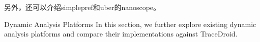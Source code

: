 另外，还可以介绍simplepref和uber的nanoscope。

Dynamic Analysis Platforms In this section, we further explore existing dynamic analysis platforms and compare their implementations against TraceDroid. 


\begin{comment}

6.3.1 AASandbox 
In October 2010, Blasing et al. were the first to present a dynamic analysis platform for Android applications: AASandbox (Android Application Sandbox) [7]. It uses static analysis to scan software for malicious patterns and performs dynamic analysis to intervene and log low-level interactions with the system for further analysis by means of a loadable kernel module developed to obtain system call logs. AASandbox uses a system call footprinting approach for detecting suspicious applications. Unfortunately, there were no known Android malware samples available at the time to evaluate this technique. AASandbox seems to be unmaintained nowadays. Compared to AASandbox, TraceDroid is implemented on a higher abstraction layer, namely the Dalvik VM instead of the Linux kernel. This allows TraceDroid to retrieve great detail on executed Java components, while missing any native code execution paths. By using the strace utility, however, we obtain a similar overview of executed system calls. We already use analysis output to detect suspicious activity. 
6.3.2 TaintDroid 
Also in October 2010, Enck et al. presented TaintDroid: a modified Android OS keeping track of taint propagation at runtime to detect privacy leaks [26]. Over time, it has been adopted as a valuable addition by many subsequent research proposals which aim to perform dynamic analysis on Android applications. TaintDroid is implemented as a modification of the Dalvik VM and thus cannot track taint within native code. TaintDroid does not come with a set of scripts or applications to allow automated analysis and stimulation of unknown applications and is thus quite different compared to our TraceDroid platform. It does also not keep track of any specific method invocations. What we could do, however, is extending TraceDroid in such a way that it also keeps track of field operations, and use this data to implement taint tracking functionality as a post-processing plug-in. 

\end{comment}
